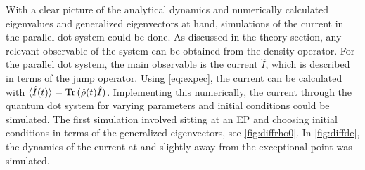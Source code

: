 \documentclass[../main.tex]{subfiles}
\begin{document}
With a clear picture of the analytical dynamics and numerically calculated eigenvalues and generalized eigenvectors at hand, simulations of the current in the parallel dot system could be done. As discussed in the theory section, any relevant observable of the system can be obtained from the density operator. For the parallel dot system, the main observable is the current $\hat I$, which is described in terms of the jump operator. Using \cref{eq:expec}, the current can be calculated with $\braket{\hat I(t)} = \operatorname{Tr}{(\hat \rho(t)\hat I)}$. Implementing this numerically, the current through the quantum dot system for varying parameters and initial conditions could be simulated. The first simulation involved sitting at an EP and choosing initial conditions in terms of the generalized eigenvectors, see \cref{fig:diffrho0}. In \cref{fig:diffde}, the dynamics of the current at and slightly away from the exceptional point was simulated.
\end{document}

